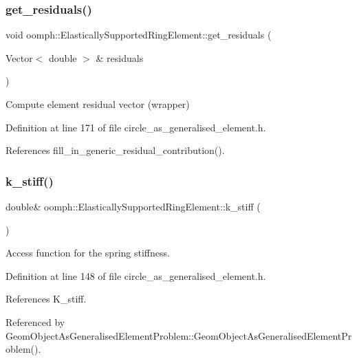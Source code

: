 \subsubsection{\texorpdfstring{get\+\_\+residuals()}{get\_residuals()}}
{\footnotesize\ttfamily void oomph\+::\+Elastically\+Supported\+Ring\+Element\+::get\+\_\+residuals (\begin{DoxyParamCaption}\item[{Vector$<$ double $>$ \&}]{residuals }\end{DoxyParamCaption})\hspace{0.3cm}{\ttfamily [inline]}}



Compute element residual vector (wrapper) 



Definition at line 171 of file circle\+\_\+as\+\_\+generalised\+\_\+element.\+h.



References fill\+\_\+in\+\_\+generic\+\_\+residual\+\_\+contribution().

\mbox{\label{classoomph_1_1ElasticallySupportedRingElement_a660b5abfdc353e41848d00617b6ba434}} 
\subsubsection{\texorpdfstring{k\+\_\+stiff()}{k\_stiff()}}
{\footnotesize\ttfamily double\& oomph\+::\+Elastically\+Supported\+Ring\+Element\+::k\+\_\+stiff (\begin{DoxyParamCaption}{ }\end{DoxyParamCaption})\hspace{0.3cm}{\ttfamily [inline]}}



Access function for the spring stiffness. 



Definition at line 148 of file circle\+\_\+as\+\_\+generalised\+\_\+element.\+h.



References K\+\_\+stiff.



Referenced by Geom\+Object\+As\+Generalised\+Element\+Problem\+::\+Geom\+Object\+As\+Generalised\+Element\+Problem().

